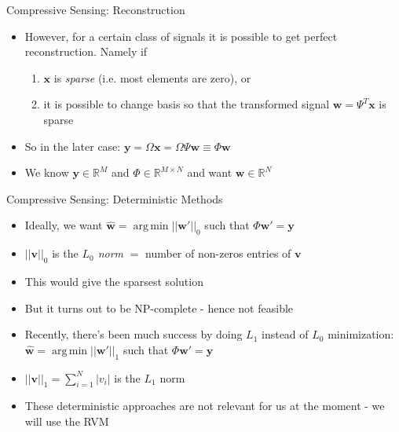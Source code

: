\documentclass[xcolor=table]{beamer}
\numberwithin{equation}{section}
\let\bs\boldsymbol
\DeclareMathOperator*{\argmin}{arg\,min}
\begin{document}
\begin{frame}{Compressive Sensing: Reconstruction}
\begin{itemize}%
\item However, for a certain class of signals it is possible to get perfect reconstruction. Namely if
\begin{enumerate}
\item $\bs x$ is \emph{sparse} (i.e. most elements are zero), or
\item it is possible to change basis so that the transformed signal $\bs w = \Psi^T \bs x$ is sparse
\end{enumerate}
\item So in the later case: $\bs y = \Omega\bs x = \Omega\Psi \bs w \equiv \Phi\bs w$
\item We know $\bs y \in\mathbb{R}^M$ and $\Phi \in \mathbb{R}^{M\times N}$ and want $\bs w\in\mathbb{R}^N$
\end{itemize}
\end{frame}

\begin{frame}{Compressive Sensing: Deterministic Methods}
\begin{itemize}%
\item Ideally, we want $\hat{\bs w} = \argmin ||\bs w'||_0$ such that $\Phi\bs w' = \bs y$
\item $||\bs v||_0$ is the \emph{$L_0$ norm} $ = $ number of non-zeros entries of $\bs v$
\item This would give the sparsest solution
\pause
\item But it turns out to be NP-complete - hence not feasible
\pause
\item Recently\cite{candes2005}, there's been much success by doing $L_1$ instead of $L_0$ minimization: $\hat{\bs w} = \argmin ||\bs w'||_1$ such that $\Phi\bs w' = \bs y$
\item $||\bs v||_1 = \sum_{i=1}^N|v_i|$ is the $L_1$ norm
\pause
\item These deterministic approaches are not relevant for us at the moment - we will use the RVM
\end{itemize}
\end{frame}
\end{document}
